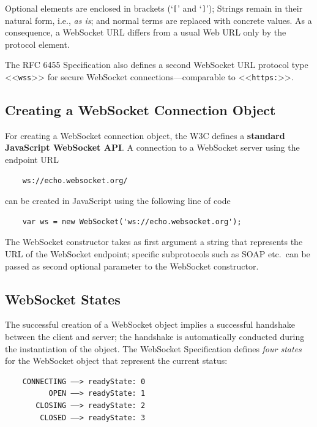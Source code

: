 \documentclass[a4paper, justified, notoc]{tufte-handout} %
\begin{document}
Optional elements are enclosed in brackets (`\texttt{[}' and `\texttt{]}'); Strings remain in their natural form, i.e., \emph{as is}; and normal terms are replaced with concrete values. As a consequence, a WebSocket URL differs from a usual Web URL only by the protocol element.

The RFC 6455 Specification also defines a second WebSocket URL protocol type <<\texttt{wss}>> for secure WebSocket connections---comparable to <<\texttt{https:}>>.

\subsection{Creating a WebSocket Connection Object} %
\label{sub:creating_a_websocket_connection_object}

For creating a WebSocket connection object, the W3C defines a \textbf{standard JavaScript WebSocket API}. A connection to a WebSocket server using the endpoint URL 
\begin{Verbatim}
	ws://echo.websocket.org/
\end{Verbatim}
can be created in JavaScript using the following line of code
\begin{Verbatim}
	var ws = new WebSocket('ws://echo.websocket.org');
\end{Verbatim}
The WebSocket constructor takes as first argument a string that represents the URL of the WebSocket endpoint; specific subprotocols such as SOAP etc.\ can be passed as second optional parameter to the WebSocket constructor.

\subsection{WebSocket States} %
\label{sub:handling_websocket_states}

The successful creation of a WebSocket object implies a successful handshake between the client and server; the handshake is automatically conducted during the instantiation of the object. The WebSocket Specification defines \emph{four states} for the WebSocket object that represent the current status:
\begin{Verbatim}
	CONNECTING ––> readyState: 0
	      OPEN ––> readyState: 1
	   CLOSING ––> readyState: 2
	    CLOSED ––> readyState: 3	
\end{Verbatim} 
\end{document}

